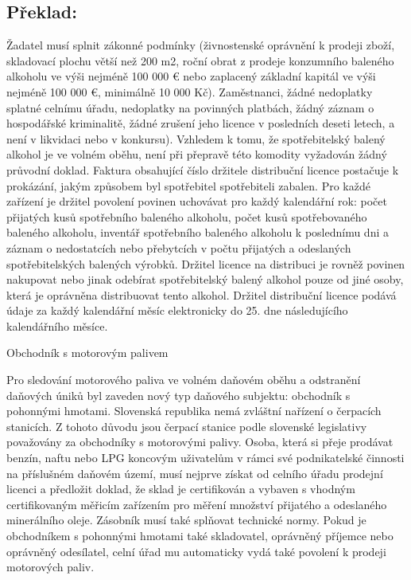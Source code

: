 \documentclass[10pt]{article}
\begin{document}
\pagebreak

\subsection*{Překlad:}

Žadatel musí splnit zákonné podmínky (živnostenské oprávnění k prodeji zboží, skladovací plochu větší než 200 m2, roční obrat z prodeje konzumního baleného alkoholu ve výši nejméně 100 000 € nebo zaplacený základní kapitál ve výši nejméně 100 000 €, minimálně 10 000 Kč). Zaměstnanci, žádné nedoplatky splatné celnímu úřadu, nedoplatky na povinných platbách, žádný záznam o hospodářské kriminalitě, žádné zrušení jeho licence v posledních deseti letech, a není v likvidaci nebo v konkursu).
Vzhledem k tomu, že spotřebitelský balený alkohol je ve volném oběhu, není při přepravě této komodity vyžadován žádný průvodní doklad.
Faktura obsahující číslo držitele distribuční licence postačuje k prokázání, jakým způsobem byl spotřebitel spotřebiteli zabalen.
Pro každé zařízení je držitel povolení povinen uchovávat pro každý kalendářní rok: počet přijatých kusů spotřebního baleného alkoholu, počet kusů spotřebovaného baleného alkoholu, inventář spotřebního baleného alkoholu k poslednímu dni a záznam o nedostatcích nebo přebytcích v počtu přijatých a odeslaných spotřebitelských balených výrobků.
Držitel licence na distribuci je rovněž povinen nakupovat nebo jinak odebírat spotřebitelský balený alkohol pouze od jiné osoby, která je oprávněna distribuovat tento alkohol.
Držitel distribuční licence podává údaje za každý kalendářní měsíc elektronicky do 25. dne následujícího kalendářního měsíce.


Obchodník s motorovým palivem

Pro sledování motorového paliva ve volném daňovém oběhu a odstranění daňových úniků byl zaveden nový typ daňového subjektu: obchodník s pohonnými hmotami.
Slovenská republika nemá zvláštní nařízení o čerpacích stanicích.
Z tohoto důvodu jsou čerpací stanice podle slovenské legislativy považovány za obchodníky s motorovými palivy.
Osoba, která si přeje prodávat benzín, naftu nebo LPG koncovým uživatelům v rámci své podnikatelské činnosti na příslušném daňovém území, musí nejprve získat od celního úřadu prodejní licenci a předložit doklad, že sklad je certifikován a vybaven s vhodným certifikovaným měřicím zařízením pro měření množství přijatého a odeslaného minerálního oleje. Zásobník musí také splňovat technické normy.
Pokud je obchodníkem s pohonnými hmotami také skladovatel, oprávněný příjemce nebo oprávněný odesílatel, celní úřad mu automaticky vydá také povolení k prodeji motorových paliv.
\end{document}
